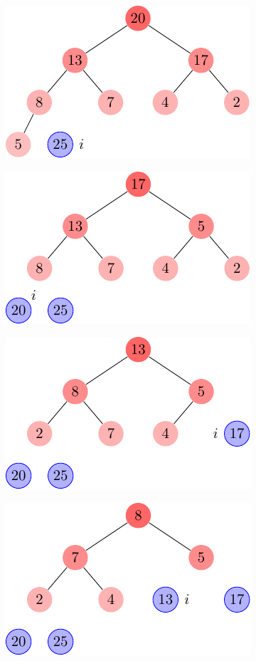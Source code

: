 \begin{description}
\begin{ex}
\begin{figure}[H]
\begin{subfigure}[t]{.30\textwidth}
          \centering
          \includegraphics[scale=0.8]{img/6_4-1/6_4-1_3}
          \caption{}\label{fig:6_4-1_3}
        \end{subfigure}
        \begin{subfigure}[t]{.30\textwidth}
          \centering
          \includegraphics[scale=0.8]{img/6_4-1/6_4-1_4}
          \caption{}\label{fig:6_4-1_4}
        \end{subfigure}
        \begin{subfigure}[t]{.30\textwidth}
          \centering
          \includegraphics[scale=0.8]{img/6_4-1/6_4-1_5}
          \caption{}\label{fig:6_4-1_5}
        \end{subfigure}
        \begin{subfigure}[t]{.30\textwidth}
          \centering
          \includegraphics[scale=0.8]{img/6_4-1/6_4-1_6}

\end{subfigure}
\end{figure}
\end{ex}
\end{description}
